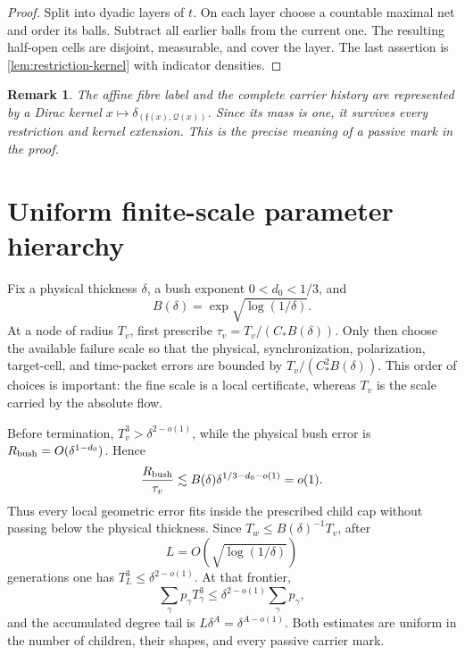 \documentclass[10pt]{article}
\newtheorem{remark}[theorem]{Remark}
\begin{document}
\begin{proof}
Split into dyadic layers of \(t\).  On each layer choose a countable maximal net and order its
balls.  Subtract all earlier balls from the current one.  The resulting half-open cells are
disjoint, measurable, and cover the layer.  The last assertion is
\cref{lem:restriction-kernel} with indicator densities.
\end{proof}

\begin{remark}
The affine fibre label and the complete carrier history are represented by a Dirac kernel
\(x\mapsto\delta_{(\mathfrak f(x),\mathscr Q(x))}\).  Since its mass is one, it survives every
restriction and kernel extension.  This is the precise meaning of a passive mark in the proof.
\end{remark}


\section{Uniform finite-scale parameter hierarchy}
\label{app:parameters}

Fix a physical thickness \(\delta\), a bush exponent \(0<d_0<1/3\), and
\[
 B(\delta)=\exp\sqrt{\log(1/\delta)}.
\]
At a node of radius \(T_v\), first prescribe
\(\tau_v=T_v/(C_*B(\delta))\).  Only then choose the available failure scale so that the
physical, synchronization, polarization, target-cell, and time-packet errors are bounded by
\(T_v/(C_*^2B(\delta))\).  This order of choices is important: the fine scale is a local
certificate, whereas \(T_v\) is the scale carried by the absolute flow.

Before termination, \(T_v^3>\delta^{2-o(1)}\), while the physical bush error is
\(R_{\rm bush}=O(\delta^{1-d_0})\).  Hence
\[
 \frac{R_{\rm bush}}{\tau_v}
 \lesssim B(\delta)\delta^{1/3-d_0-o(1)}=o(1).
\]
Thus every local geometric error fits inside the prescribed child cap without passing below the
physical thickness.  Since \(T_w\le B(\delta)^{-1}T_v\), after
\[
 L=O(\sqrt{\log(1/\delta)})
\]
generations one has \(T_L^3\le\delta^{2-o(1)}\).  At that frontier,
\[
 \sum_\gamma p_\gamma T_\gamma^3
 \le \delta^{2-o(1)}\sum_\gamma p_\gamma,
\]
and the accumulated degree tail is
\(L\delta^A=\delta^{A-o(1)}\).  Both estimates are uniform in the number of children, their
shapes, and every passive carrier mark.
\end{document}
